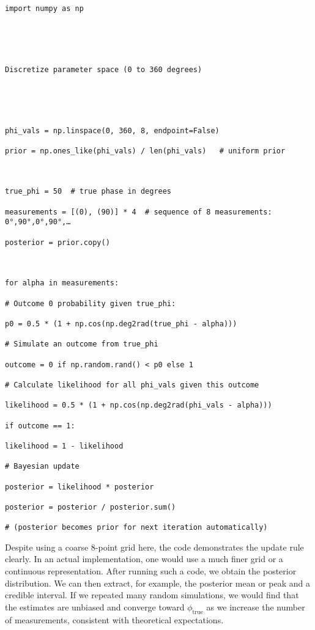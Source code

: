 \begin{verbatim}

import numpy as np





Discretize parameter space (0 to 360 degrees)





phi_vals = np.linspace(0, 360, 8, endpoint=False)

prior = np.ones_like(phi_vals) / len(phi_vals)   # uniform prior



true_phi = 50  # true phase in degrees

measurements = [(0), (90)] * 4  # sequence of 8 measurements: 0°,90°,0°,90°,…

posterior = prior.copy()



for alpha in measurements:

# Outcome 0 probability given true_phi:

p0 = 0.5 * (1 + np.cos(np.deg2rad(true_phi - alpha)))

# Simulate an outcome from true_phi

outcome = 0 if np.random.rand() < p0 else 1

# Calculate likelihood for all phi_vals given this outcome

likelihood = 0.5 * (1 + np.cos(np.deg2rad(phi_vals - alpha)))

if outcome == 1:

likelihood = 1 - likelihood

# Bayesian update

posterior = likelihood * posterior

posterior = posterior / posterior.sum()

# (posterior becomes prior for next iteration automatically)

\end{verbatim}



Despite using a coarse 8-point grid here, the code demonstrates the
update rule clearly. In an actual implementation, one would use a much
finer grid or a continuous representation. After running such a code,
we obtain the posterior distribution. We can then extract, for
example, the posterior mean or peak and a credible interval. If we
repeated many random simulations, we would find that the estimates are
unbiased and converge toward $\phi_{\text{true}}$ as we increase the
number of measurements, consistent with theoretical expectations.



